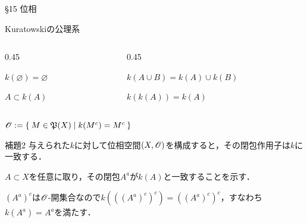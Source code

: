 \documentclass[uplatex,a4paper,dvipdfmx,aspectratio=169,11pt]{beamer}
\begin{document}
\begin{frame}[fragile]{\S 15 位相}
    \begin{block}{Kuratowskiの公理系}
        \vspace{-0.5em}
        \begin{columns}
            \begin{column}{0.45\textwidth}
                \begin{description}[$\textbf{K}_1$:]
                    \item[$\textbf{K}_1$:] $k(\varnothing) = \varnothing$
                    \item[$\textbf{K}_2$:] $A \subset k(A)$
                \end{description}
            \end{column}
            \begin{column}{0.45\textwidth}
                \begin{description}[$\textbf{K}_1$:]
                    \item[$\textbf{K}_3$:] $k(A \cup B) = k(A) \cup k(B)$
                    \item[$\textbf{K}_4$:] $k(k(A)) = k(A)$
                \end{description}
            \end{column}
        \end{columns}
    \end{block}
    $\mathscr{O} := \Set{ M \in {\mathord{\mathfrak{P}}\qty(X)} | k(M^c) = M^c}$

    \begin{block}{補題2}
        与えられた$k$に対して位相空間$(X, \mathscr{O})$を構成すると，その閉包作用子は$k$に一致する．
    \end{block}

    $A \subset X$を任意に取り，その閉包$A^a$が$k(A)$と一致することを示す．

    \medskip{}

    $(A^a)^c$は$\mathscr{O}$-開集合なので$k(((A^a)^c)^c) = ((A^a)^c)^c$，すなわち$k(A^a) = A^a$を満たす．
\end{frame}
\end{document}
